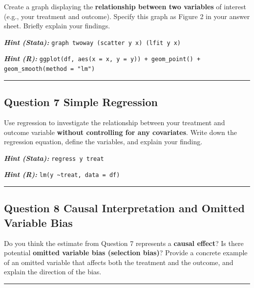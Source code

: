 \documentclass[paper=a4, fontsize=11pt]{scrartcl}
\newcommand{\horrule}[1]{\rule{\linewidth}{#1}}
\begin{document}
Create a graph displaying the \textbf{relationship between two variables} of interest (e.g., your treatment and outcome). Specify this graph as Figure 2 in your answer sheet. Briefly explain your findings.

\medskip
\textit{\textbf{Hint (Stata):}} \texttt{graph twoway (scatter y x) (lfit y x)}

\textit{\textbf{Hint (R):}} \texttt{ggplot(df, aes(x = x, y = y)) + geom\_point() + geom\_smooth(method = "lm")}

\bigskip\horrule{0.4pt}\bigskip


\subsection*{Question 7 \quad Simple Regression}

Use regression to investigate the relationship between your treatment and outcome variable \textbf{without controlling for any covariates}. Write down the regression equation, define the variables, and explain your finding.

\medskip
\textit{\textbf{Hint (Stata):}} \texttt{regress y treat}

\textit{\textbf{Hint (R):}} \texttt{lm(y \textasciitilde treat, data = df)}

\bigskip\horrule{0.4pt}\bigskip


\subsection*{Question 8 \quad Causal Interpretation and Omitted Variable Bias}

Do you think the estimate from Question 7 represents a \textbf{causal effect}? Is there potential \textbf{omitted variable bias (selection bias)}? Provide a concrete example of an omitted variable that affects both the treatment and the outcome, and explain the direction of the bias.

\bigskip\horrule{0.4pt}\bigskip

\end{document}

